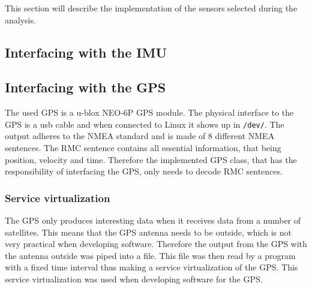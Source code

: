 \label{sub:implementation_of_sensors}
This section will describe the implementation of the sensors selected during the analysis.


\subsection{Interfacing with the IMU}\label{sec:interface_IMU}



\subsection{Interfacing with the GPS}\label{sec:interface_GPS}
The used GPS is a u-blox NEO-6P GPS module.
The physical interface to the GPS is a usb cable and when connected to Linux it shows up in \texttt{/dev/}.
The output adheres to the NMEA standard and is made of 8 different NMEA sentences.
The RMC sentence contains all essential information, that being position, velocity and time.
Therefore the implemented GPS class, that has the responsibility of interfacing the GPS, only needs to decode RMC sentences.

\subsubsection{Service virtualization}
The GPS only produces interesting data when it receives data from a number of satellites. 
This means that the GPS antenna needs to be outside, which is not very practical when developing software.
Therefore the output from the GPS with the antenna outside was piped into a file.
This file was then read by a program with a fixed time interval thus making a service virtualization of the GPS.
This service virtualization was used when developing software for the GPS.